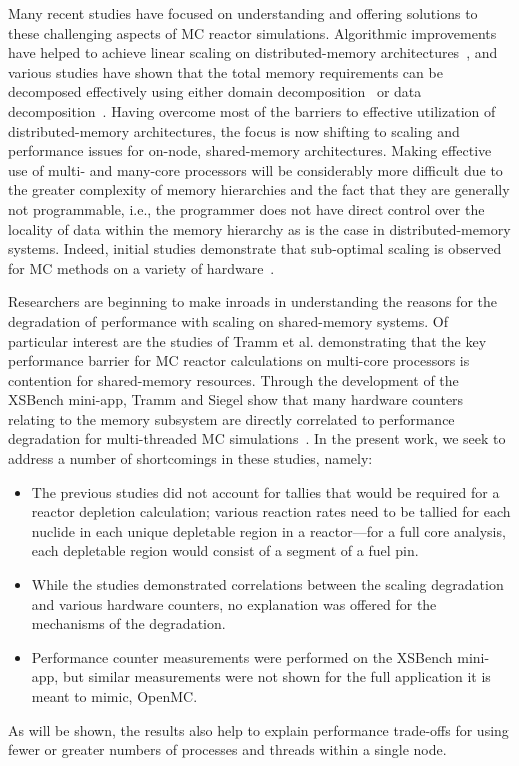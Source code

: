 \documentclass{mc2015}
\begin{document}
Many recent studies have focused on understanding and offering solutions to
these challenging aspects of MC reactor simulations. Algorithmic improvements
have helped to achieve linear scaling on distributed-memory
architectures~\cite{nse-romano-2012, ane-romano-2013}, and various studies have
shown that the total memory requirements can be decomposed effectively using
either domain decomposition~\cite{jcp-siegel-2012, jcp-siegel-2013,
  physor-horelik-2014, pc-horelik-2014} or data
decomposition~\cite{jcp-romano-2013}. Having overcome most of the barriers to
effective utilization of distributed-memory architectures, the focus is now
shifting to scaling and performance issues for on-node, shared-memory
architectures. Making effective use of multi- and many-core processors will be
considerably more difficult due to the greater complexity of memory hierarchies
and the fact that they are generally not programmable, i.e., the programmer does
not have direct control over the locality of data within the memory hierarchy
as is the case in distributed-memory systems. Indeed, initial studies
demonstrate that sub-optimal scaling is observed for MC methods on a variety of
hardware~\cite{ijhpca-siegel-2014}.

Researchers are beginning to make inroads in understanding the reasons for the
degradation of performance with scaling on shared-memory systems. Of particular
interest are the studies of Tramm et al. demonstrating that the key performance
barrier for MC reactor calculations on multi-core processors is contention for
shared-memory resources. Through the development of the XSBench mini-app, Tramm
and Siegel show that many hardware counters relating to the memory subsystem
are directly correlated to performance degradation for multi-threaded MC
simulations~\cite{physor-tramm-2014, ane-tramm-2014}. In the present work, we
seek to address a number of shortcomings in these studies, namely:
\begin{itemize}
\item The previous studies did not account for tallies that would be required
  for a reactor depletion calculation; various reaction rates need to be
  tallied for each nuclide in each unique depletable region in a reactor---for
  a full core analysis, each depletable region would consist of a segment of a
  fuel pin.
\item While the studies demonstrated correlations between the scaling
  degradation and various hardware counters, no explanation was offered for the
  mechanisms of the degradation.
\item Performance counter measurements were performed on the XSBench mini-app,
  but similar measurements were not shown for the full application it is meant
  to mimic, OpenMC.
\end{itemize}
As will be shown, the results also help to explain performance trade-offs for
using fewer or greater numbers of processes and threads within a single node.
\end{document}
